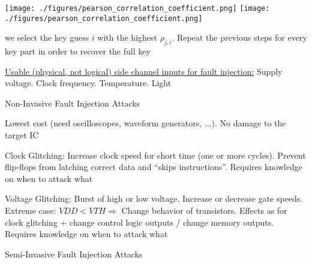 \documentclass[landscape, a4paper]{article}
\begin{document}
\begin{minipage}[t]{0.2\linewidth}
\begin{betterlist}
\begin{betterlist}
\begin{betterlist}
				\texttt{[image: ./figures/pearson\_correlation\_coefficient.png]}
				\texttt{[image: ./figures/pearson\_correlation\_coefficient.png]}
				\item we select the key guess $i$ with the highest $\rho_{j,i}$. Repeat the previous steps for every key part in order to recover the full key
			\end{betterlist}
		\end{betterlist}
	\end{betterlist}
	\begin{betterlist}
		\item \underline{Usable (physical, not logical) side channel \alert{inputs} for fault injection:} Supply voltage. Clock frequency. Temperature. Light
		\item \alert{Non-Invasive Fault Injection Attacks}
		\begin{betterlist}
			\item Lowest cost (need oscilloscopes, waveform generators, ...). No damage to the target IC
			\item \alert{Clock Glitching:} Increase clock speed for short time (one or more cycles). Prevent flip-flops from latching correct data and \enquote{skips instructions}. Requires knowledge on when to attack what
			\item \alert{Voltage Glitching:} Burst of high or low voltage. Increase or decrease gate speeds. Extreme case: $VDD < VTH \Rightarrow$ Change behavior of transistors. Effects as for clock glitching + change control logic outputs / change memory outputs. Requires knowledge on when to attack what
		\end{betterlist}
		\item \alert{Semi-Invasive Fault Injection Attacks}

\end{betterlist}
\end{minipage}
\end{document}
